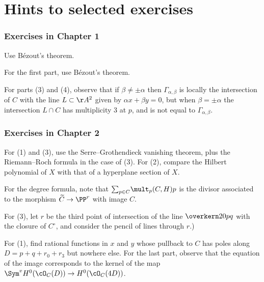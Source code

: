 
\chapter*{Hints to selected exercises}
\label{hints}

\begingroup
\def\addcontentsline#1#2#3{\relax} %

\subsection*{Exercises in Chapter 1\nopunct}

Use B\'ezout's theorem.

For the first part, use B\'ezout's theorem.

For parts (3) and (4), observe that if $\beta \neq \pm \alpha$ then
$\Gamma_{\alpha, \beta}$  is locally the intersection of $C$ with the
line $L \subset \AA^2$ given by $\alpha x + \beta y = 0$, but when
$\beta = \pm \alpha$
the intersection $L \cap C$ has multiplicity 3 at $p$,
and is not equal to $\Gamma_{\alpha, \beta}$.

\subsection*{Exercises in Chapter 2\nopunct}

For (1) and (3), use the
%
%
%
Serre--Grothendieck vanishing theorem, plus the
Riemann--Roch formula in the case of (3).
For (2), compare the Hilbert polynomial of $X$ with that of a hyperplane section of $X$.

For
the degree formula, note that $\smash{\sum_{p\in C}}
\mult_p(C,H) p$ is the divisor associated to the morphism
$\widetilde C \to \PP^r$ with image $C$.

For (3), let $r$ be the third point of intersection of the
  line $\overkern20{pq}$ with the closure of $C^\circ$, and consider the
  pencil of lines through $r$.)

For (1), find rational functions in $x$ and $y$ whose pullback to $C$
has poles along $D = p + q + r_0 + r_3$ but nowhere else. For the last
part, observe that the equation of the image corresponds to the kernel
of the map $\Sym^v H^0(\cO_C(D)) \to H^0(\cO_C(4D))$.
%

